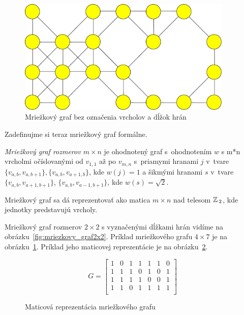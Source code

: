 \begin{figure}[h]
\centering
\includegraphics[height=5.5cm]{./img/mriezkovy_graf.eps}
\caption{Mriežkový graf bez označenia vrcholov a dĺžok hrán}
\label{fig:mriezkovy_graf}
\end{figure}


Zadefinujme si teraz mriežkový graf formálne.

\begin{define}
{\sl Mriežkový graf rozmerov $m \times n$} je ohodnotený graf s~ohodnotením $w$ s m*n vrcholmi očíslovanými od $v_{1,1}$ až po $v_{m,n}$ 
s~priamymi hranami $j$ v~tvare $\{v_{a,b}, v_{a,b+1}\}, \{v_{a,b}, v_{a+1,b}\}$, kde $w(j) = 1$ 
a šikmými hranami $ s $ v~tvare 
$\{v_{a,b}, v_{a+1,b+1}\}$, $\{v_{a,b}, v_{a-1,b+1}\}$, kde $ w(s) = \sqrt{2}$.
\end{define}

\begin{note}
	Mriežkový graf sa dá reprezentovať ako matica $m \times n$ nad telesom $\mathbb{Z}\,_2$, kde jednotky predstavujú vrcholy. 
\end{note}
\begin{example}
Mriežkový graf rozmerov $2 \times 2$ s vyznačenými dĺžkami
hrán vidíme na obrázku~\ref{fig:mriezkovy_graf2x2}.
Príklad mriežkového grafu $4 \times 7$ je na obrázku~\ref{fig:mriezkovy_graf}.
Príklad jeho maticovej reprezentácie je na obrázku~\ref{fig:maticova_reprezentacia}.

\end{example}


\begin{figure}[h]


\[
G =
  \begin{bmatrix}
    1 & 0 & 1 & 1 & 1 & 1 & 0\\
	1 & 1 & 1 & 0 & 1 & 0 & 1\\
	1 & 1 & 1 & 1 & 0 & 0 & 1\\
	1 & 1 & 0 & 1 & 1 & 1 & 1\\
  \end{bmatrix}
\]

\caption{Maticová reprezentácia mriežkového grafu}
\label{fig:maticova_reprezentacia}
\end{figure}




